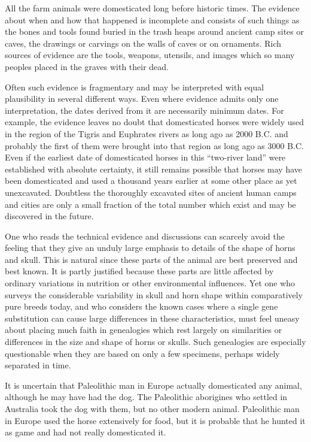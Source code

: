 All the farm animals were domesticated long before historic times. The evidence about when and how that happened
is incomplete and consists of such things as the bones and tools found buried in the trash heaps around ancient
camp sites or caves, the drawings or carvings on the walls of caves or on ornaments. Rich sources of evidence are
the tools, weapons, utensils, and images which so many peoples placed in the graves with their dead.

Often such evidence is fragmentary and may be interpreted with equal plausibility in several different ways. Even
where evidence admits only one interpretation, the dates derived from it are necessarily minimum dates. For example,
the evidence leaves no doubt that domesticated horses were widely used in the region of the Tigris and Euphrates
rivers as long ago as 2000 B.C. and probably the first of them were brought into that region as long ago as 3000
B.C. Even if the earliest date of domesticated horses in this ``two-river land'' were established with absolute
certainty, it still remains possible that horses may have been domesticated and used a thousand years earlier at
some other place as yet unexcavated. Doubtless the thoroughly excavated sites of ancient human camps and cities
are only a small fraction of the total number which exist and may be discovered in the future.

One who reads the technical evidence and discussions can scarcely avoid the feeling that they give an unduly large
emphasis to details of the shape of horns and skull. This is natural since these parts of the animal are best
preserved and best known. It is partly justified because these parts are little affected by ordinary variations
in nutrition or other environmental influences. Yet one who surveys the considerable variability in skull and
horn shape within comparatively pure breeds today, and who considers the known cases where a single gene
substitution can cause large differences in these characteristics, must feel uneasy about placing much faith in
genealogies which rest largely on similarities or differences in the size and shape of horns or skulls. Such
genealogies are especially questionable when they are based on only a few specimens, perhaps widely separated
in time.

It is uncertain that Paleolithic man in Europe actually domesticated any animal, although he may have had the dog.
The Paleolithic aborigines who settled in Australia took the dog with them, but no other modern animal. Paleolithic
man in Europe used the horse extensively for food, but it is probable that he hunted it as game and had not really
domesticated it.

